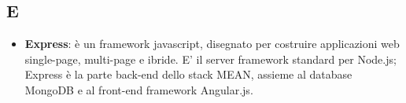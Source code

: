 \subsection{E}
\begin{itemize}
	\item
	\textbf{Express}: è un framework javascript, disegnato per costruire applicazioni web single-page, multi-page e ibride. E' il server framework standard per Node.js; Express è la parte back-end dello stack MEAN, assieme al database MongoDB e al front-end framework Angular.js.
\end{itemize}